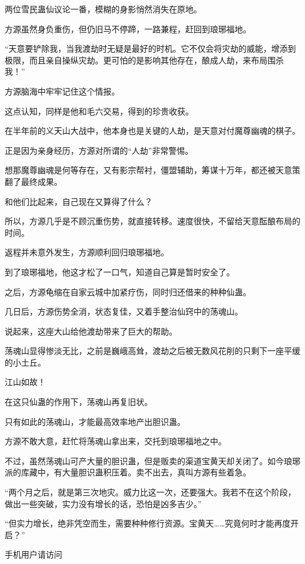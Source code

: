 \begin{this_body}
两位雪民蛊仙议论一番，模糊的身影悄然消失在原地。

方源虽然身负重伤，但仍旧马不停蹄，一路兼程，赶回到琅琊福地。

“天意要铲除我，当我渡劫时无疑是最好的时机。它不仅会将灾劫的威能，增添到极限，而且亲自操纵灾劫。更可怕的是影响其他存在，酿成人劫，来布局围杀我！”

方源脑海中牢牢记住这个情报。

这点认知，同样是他和毛六交易，得到的珍贵收获。

在半年前的义天山大战中，他本身也是关键的人劫，是天意对付魔尊幽魂的棋子。

正是因为亲身经历，方源对所谓的“人劫”非常警惕。

想那魔尊幽魂是何等存在，又有影宗帮衬，僵盟辅助，筹谋十万年，都还被天意策翻了最终成果。

和他们比起来，自己现在又算得了什么？

所以，方源几乎是不顾沉重伤势，就直接转移。速度很快，不留给天意酝酿布局的时间。

返程并未意外发生，方源顺利回归琅琊福地。

到了琅琊福地，他这才松了一口气，知道自己算是暂时安全了。

之后，方源龟缩在自家云城中加紧疗伤，同时归还借来的种种仙蛊。

几日后，方源伤势全消，状态复佳，又着手整治仙窍中的荡魂山。

说起来，这座大山给他渡劫带来了巨大的帮助。

荡魂山显得惨淡无比，之前是巍峨高耸，渡劫之后被无数风花削的只剩下一座平缓的小土丘。

江山如故！

在这只仙蛊的作用下，荡魂山再复旧状。

只有如此的荡魂山，才能最高效率地产出胆识蛊。

方源不敢大意，赶忙将荡魂山拿出来，交托到琅琊福地之中。

不过，虽然荡魂山可产大量的胆识蛊，但是贩卖的渠道宝黄天却关闭了。如今琅琊派的库藏中，有大量胆识蛊积压着。卖不出去，真叫方源有些着急。

“两个月之后，就是第三次地灾。威力比这一次，还要强大。我若不在这个阶段，做出一些突破，实力没有增长的话，恐怕是凶多吉少。”

“但实力增长，绝非凭空而生，需要种种修行资源。宝黄天……究竟何时才能再度开启？”

手机用户请访问

\end{this_body}


